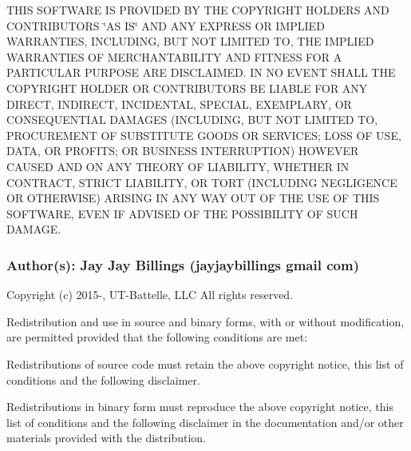 T\+H\+IS S\+O\+F\+T\+W\+A\+RE IS P\+R\+O\+V\+I\+D\+ED BY T\+HE C\+O\+P\+Y\+R\+I\+G\+HT H\+O\+L\+D\+E\+RS A\+ND C\+O\+N\+T\+R\+I\+B\+U\+T\+O\+RS \char`\"{}\+A\+S I\+S\char`\"{} A\+ND A\+NY E\+X\+P\+R\+E\+SS OR I\+M\+P\+L\+I\+ED W\+A\+R\+R\+A\+N\+T\+I\+ES, I\+N\+C\+L\+U\+D\+I\+NG, B\+UT N\+OT L\+I\+M\+I\+T\+ED TO, T\+HE I\+M\+P\+L\+I\+ED W\+A\+R\+R\+A\+N\+T\+I\+ES OF M\+E\+R\+C\+H\+A\+N\+T\+A\+B\+I\+L\+I\+TY A\+ND F\+I\+T\+N\+E\+SS F\+OR A P\+A\+R\+T\+I\+C\+U\+L\+AR P\+U\+R\+P\+O\+SE A\+RE D\+I\+S\+C\+L\+A\+I\+M\+ED. IN NO E\+V\+E\+NT S\+H\+A\+LL T\+HE C\+O\+P\+Y\+R\+I\+G\+HT H\+O\+L\+D\+ER OR C\+O\+N\+T\+R\+I\+B\+U\+T\+O\+RS BE L\+I\+A\+B\+LE F\+OR A\+NY D\+I\+R\+E\+CT, I\+N\+D\+I\+R\+E\+CT, I\+N\+C\+I\+D\+E\+N\+T\+AL, S\+P\+E\+C\+I\+AL, E\+X\+E\+M\+P\+L\+A\+RY, OR C\+O\+N\+S\+E\+Q\+U\+E\+N\+T\+I\+AL D\+A\+M\+A\+G\+ES (I\+N\+C\+L\+U\+D\+I\+NG, B\+UT N\+OT L\+I\+M\+I\+T\+ED TO, P\+R\+O\+C\+U\+R\+E\+M\+E\+NT OF S\+U\+B\+S\+T\+I\+T\+U\+TE G\+O\+O\+DS OR S\+E\+R\+V\+I\+C\+ES; L\+O\+SS OF U\+SE, D\+A\+TA, OR P\+R\+O\+F\+I\+TS; OR B\+U\+S\+I\+N\+E\+SS I\+N\+T\+E\+R\+R\+U\+P\+T\+I\+ON) H\+O\+W\+E\+V\+ER C\+A\+U\+S\+ED A\+ND ON A\+NY T\+H\+E\+O\+RY OF L\+I\+A\+B\+I\+L\+I\+TY, W\+H\+E\+T\+H\+ER IN C\+O\+N\+T\+R\+A\+CT, S\+T\+R\+I\+CT L\+I\+A\+B\+I\+L\+I\+TY, OR T\+O\+RT (I\+N\+C\+L\+U\+D\+I\+NG N\+E\+G\+L\+I\+G\+E\+N\+CE OR O\+T\+H\+E\+R\+W\+I\+SE) A\+R\+I\+S\+I\+NG IN A\+NY W\+AY O\+UT OF T\+HE U\+SE OF T\+H\+IS S\+O\+F\+T\+W\+A\+RE, E\+V\+EN IF A\+D\+V\+I\+S\+ED OF T\+HE P\+O\+S\+S\+I\+B\+I\+L\+I\+TY OF S\+U\+CH D\+A\+M\+A\+GE.

\subsubsection*{Author(s)\+: Jay Jay Billings (jayjaybillings  gmail  com) }



 Copyright (c) 2015-\/, U\+T-\/\+Battelle, L\+LC All rights reserved.

Redistribution and use in source and binary forms, with or without modification, are permitted provided that the following conditions are met\+:

Redistributions of source code must retain the above copyright notice, this list of conditions and the following disclaimer.

Redistributions in binary form must reproduce the above copyright notice, this list of conditions and the following disclaimer in the documentation and/or other materials provided with the distribution.

